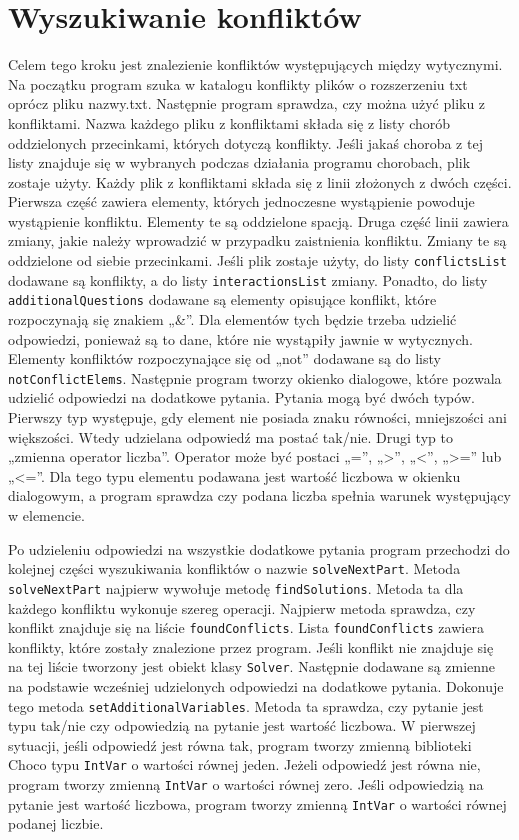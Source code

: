 \section{Wyszukiwanie konfliktów}
Celem tego kroku jest znalezienie konfliktów występujących między wytycznymi. Na początku program szuka w katalogu konflikty plików o rozszerzeniu txt oprócz pliku nazwy.txt. Następnie program sprawdza, czy można użyć pliku z konfliktami. Nazwa każdego pliku z konfliktami składa się z listy chorób oddzielonych przecinkami, których dotyczą konflikty. Jeśli jakaś choroba z tej listy znajduje się w wybranych podczas działania programu chorobach, plik zostaje użyty. Każdy plik z konfliktami składa się z linii złożonych z dwóch części. Pierwsza część zawiera elementy, których jednoczesne wystąpienie powoduje wystąpienie konfliktu. Elementy te są oddzielone spacją. Druga część linii zawiera zmiany, jakie należy wprowadzić w przypadku zaistnienia konfliktu. Zmiany te są oddzielone od siebie przecinkami. Jeśli plik zostaje użyty, do listy \texttt{conflictsList} dodawane są konflikty, a do listy \texttt{interactionsList} zmiany. Ponadto, do listy \texttt{additionalQuestions} dodawane są elementy opisujące konflikt, które rozpoczynają się znakiem „\&”. Dla elementów tych będzie trzeba udzielić odpowiedzi, ponieważ są to dane, które nie wystąpiły jawnie w wytycznych. Elementy konfliktów rozpoczynające się od „not” dodawane są do listy \texttt{notConflictElems}. Następnie program tworzy okienko dialogowe, które pozwala udzielić odpowiedzi na dodatkowe pytania. Pytania mogą być dwóch typów. Pierwszy typ występuje, gdy element nie posiada znaku równości, mniejszości ani większości. Wtedy udzielana odpowiedź ma postać tak/nie. Drugi typ to „zmienna operator liczba”. Operator może być postaci „=”, „>”, „<”, „>=” lub „<=”. Dla tego typu elementu podawana jest wartość liczbowa w okienku dialogowym, a program sprawdza czy podana liczba spełnia warunek występujący w elemencie. 

Po udzieleniu odpowiedzi na wszystkie dodatkowe pytania program przechodzi do kolejnej części wyszukiwania konfliktów o nazwie \texttt{solveNextPart}. Metoda \texttt{solveNextPart} najpierw wywołuje metodę \texttt{findSolutions}. Metoda ta dla każdego konfliktu wykonuje szereg operacji. Najpierw metoda sprawdza, czy konflikt znajduje się na liście \texttt{foundConflicts}. Lista \texttt{foundConflicts} zawiera konflikty, które zostały znalezione przez program. Jeśli konflikt nie znajduje się na tej liście tworzony jest obiekt klasy \texttt{Solver}. Następnie dodawane są zmienne na podstawie wcześniej udzielonych odpowiedzi na dodatkowe pytania. Dokonuje tego metoda \texttt{setAdditionalVariables}. Metoda ta sprawdza, czy pytanie jest typu tak/nie czy odpowiedzią na pytanie jest wartość liczbowa. W pierwszej sytuacji, jeśli odpowiedź jest równa tak, program tworzy zmienną biblioteki Choco typu \texttt{IntVar} o wartości równej jeden. Jeżeli odpowiedź jest równa nie, program tworzy zmienną \texttt{IntVar} o wartości równej zero. Jeśli odpowiedzią na pytanie jest wartość liczbowa, program tworzy zmienną \texttt{IntVar} o wartości równej podanej liczbie. 

